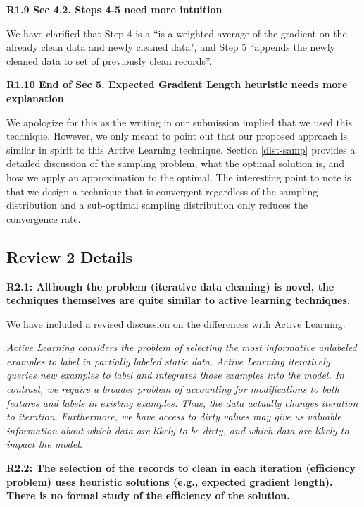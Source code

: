 \noindent\textbf{R1.9 Sec 4.2. Steps 4-5 need more intuition}

\noindent  We have clarified that Step 4 is a ``is a weighted average of the gradient on the already clean data and newly cleaned data", and Step 5 ``appends the newly cleaned data to set of previously clean records''.

\vspace{0.5em}

\noindent\textbf{R1.10 End of Sec 5. Expected Gradient Length heuristic needs more explanation}

\noindent  We apologize for this as the writing in our submission implied that we used this technique. However, we only meant to point out that our proposed approach is similar in spirit to this Active Learning technique.
Section \ref{dist-samp} provides a detailed discussion of the sampling problem, what the optimal solution is, and how we apply an approximation to the optimal.
The interesting point to note is that we design a technique that is convergent regardless of the sampling distribution and a sub-optimal sampling distribution only reduces the convergence rate.

\subsection*{Review 2 Details}

\noindent\textbf{R2.1: Although the problem (iterative data cleaning) is novel, the techniques themselves are quite similar to active learning techniques.}

\noindent  We have included a revised discussion on the differences with Active Learning:

\emph{Active Learning considers the problem of selecting the most informative unlabeled examples to label in partially labeled static data.
Active Learning iteratively queries new examples to label and integrates those examples into the model.
In contrast, we require a broader problem of accounting for modifications to both features and labels in existing examples.
Thus, the data actually changes iteration to iteration.
Furthermore, we have access to dirty values may give us valuable information about which data are likely to be dirty, and which data are likely to impact the model. }

\vspace{0.5em}

\noindent\textbf{R2.2: The selection of the records to clean in each iteration (efficiency problem) uses heuristic solutions (e.g., expected gradient length). There is no formal study of the efficiency of the solution.}

